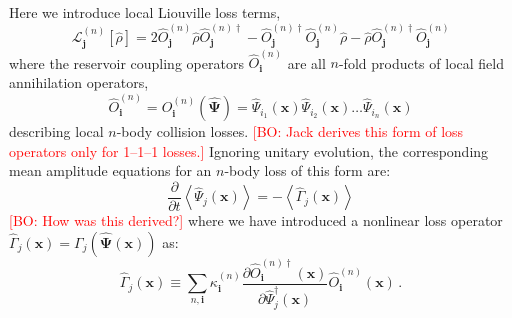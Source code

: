 \documentclass[aps,prl,twocolumn,showpacs,amsmath,amssymb,superscriptaddress]{revtex4-1}
\newcommand{\bogdansremark}[1]{\textcolor{red}{{[}BO: #1{]}}}
\newcommand{\bx}{\boldsymbol{x}}
\begin{document}
Here we introduce local Liouville loss terms,
\begin{equation}
	\mathcal{L}_{\mathbf{j}}^{(n)} \left[ \hat{\rho}\right] =
	2 \hat{O}_{\mathbf{j}}^{(n)} \hat{\rho}\hat{O}_{\mathbf{j}}^{(n)\dagger} -
	\hat{O}_{\mathbf{j}}^{(n)\dagger}\hat{O}_{\mathbf{j}}^{(n)}\hat{\rho} -
	\hat{\rho}\hat{O}_{\mathbf{j}}^{(n)\dagger}\hat{O}_{\mathbf{j}}^{(n)}
\end{equation}
where the reservoir coupling operators $\hat{O}_{\mathbf{i}}^{(n)}$
are all $n$-fold products of local field annihilation operators,
\begin{equation}
	\hat{O}_{\mathbf{i}}^{(n)} =
	O_{\mathbf{i}}^{(n)} \left( \widehat{\boldsymbol{\Psi}} \right) =
	\widehat{\Psi}_{i_{1}} \left( \bx \right)
	\widehat{\Psi}_{i_{2}} \left( \bx \right) \ldots
	\widehat{\Psi}_{i_{n}} \left( \bx \right)
\end{equation}
describing local $n$-body collision losses.
	\bogdansremark{Jack derives this form of loss operators only for 1--1--1 losses.}
Ignoring unitary evolution, the corresponding mean amplitude equations
for an $n$-body loss of this form are:
\begin{equation}
	\frac{\partial}{\partial t} \left\langle
		\widehat{\Psi}_{j} \left( \bx \right)
	\right\rangle =
	-\left\langle \hat{\Gamma}_{j} \left( \bx \right) \right\rangle
\end{equation}
	\bogdansremark{How was this derived?}
where we have introduced a nonlinear loss operator $\hat{\Gamma}_{j} \left( \bx \right) =
\Gamma_{j} \left( \widehat{\boldsymbol{\Psi}} \left( \bx \right) \right)$
as:
\begin{equation}
	\hat{\Gamma}_{j} \left( \bx \right) \equiv
	\sum_{n,\mathbf{i}} \kappa_{\mathbf{i}}^{(n)}
	\frac{\partial\hat{O}_{\mathbf{i}}^{(n)\dagger}	\left( \bx \right)}
		{\partial \hat{\Psi}_{j}^{\dagger} \left( \bx \right)}
	\hat{O}_{\mathbf{i}}^{(n)} \left( \bx \right) \,.
\end{equation}
\end{document}
